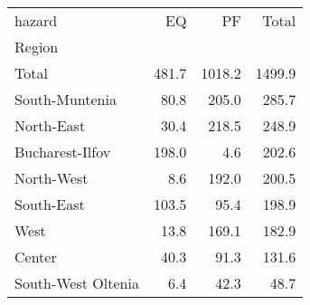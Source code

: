 \begin{tabular}{lrrr}
\toprule
hazard &     EQ &      PF &   Total \\
Region             &        &         &         \\
\midrule
Total              &  481.7 &  1018.2 &  1499.9 \\
South-Muntenia     &   80.8 &   205.0 &   285.7 \\
North-East         &   30.4 &   218.5 &   248.9 \\
Bucharest-Ilfov    &  198.0 &     4.6 &   202.6 \\
North-West         &    8.6 &   192.0 &   200.5 \\
South-East         &  103.5 &    95.4 &   198.9 \\
West               &   13.8 &   169.1 &   182.9 \\
Center             &   40.3 &    91.3 &   131.6 \\
South-West Oltenia &    6.4 &    42.3 &    48.7 \\
\bottomrule
\end{tabular}
